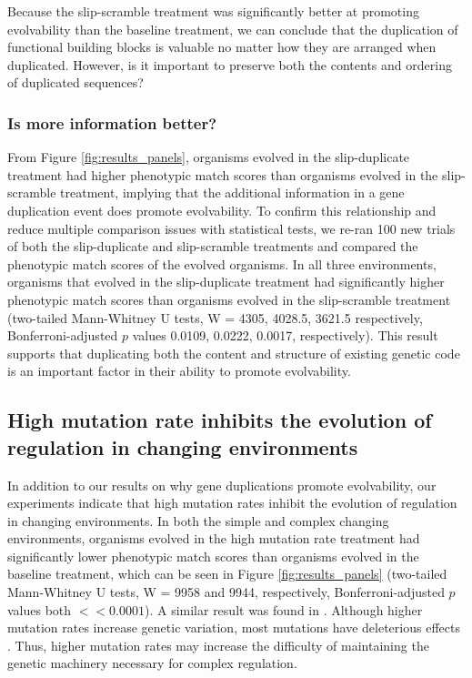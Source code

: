 Because the slip-scramble treatment was significantly better at promoting evolvability than the baseline treatment, we can conclude that the duplication of functional building blocks is valuable no matter how they are arranged when duplicated. However, is %
it important to
preserve both the contents and ordering of duplicated sequences?

\subsubsection{Is more information better?}
From Figure \ref{fig:results_panels}, organisms evolved in the slip-duplicate treatment had higher phenotypic match scores than organisms evolved in the slip-scramble treatment, implying that the additional information in a gene duplication event %
does
promote evolvability. To confirm this relationship and reduce multiple comparison issues with statistical tests, we re-ran 100 new trials of both the slip-duplicate and slip-scramble treatments %
and compared the phenotypic match scores of the evolved organisms. In all three environments, organisms that evolved in the slip-duplicate treatment had significantly higher phenotypic match scores than organisms evolved in the slip-scramble treatment (two-tailed Mann-Whitney U tests, W = 4305, 4028.5, 3621.5 respectively, Bonferroni-adjusted $p$ values 0.0109, 0.0222, 0.0017, respectively). This result supports that %
duplicating both the content and structure of existing genetic code is an important factor in their ability to promote evolvability.

\subsection{High mutation rate inhibits the evolution of regulation in changing environments}
In addition to our results on why gene duplications promote evolvability, our experiments
indicate that
high mutation rates inhibit the evolution of regulation in changing environments. In both the simple and complex changing environments, organisms evolved in the high mutation rate treatment had significantly lower phenotypic match scores than organisms evolved in the baseline treatment, which can be seen in Figure \ref{fig:results_panels} (two-tailed Mann-Whitney U tests, W = 9958 and 9944, respectively, Bonferroni-adjusted $p$ values both $<< 0.0001$).
A similar result was found in \citep{Lalejini:2016plasticity}. Although higher mutation rates increase genetic variation, most mutations have deleterious effects \citep{Schlichting:2002jl}. Thus, higher mutation rates may increase the difficulty of maintaining the genetic machinery necessary for complex regulation.

